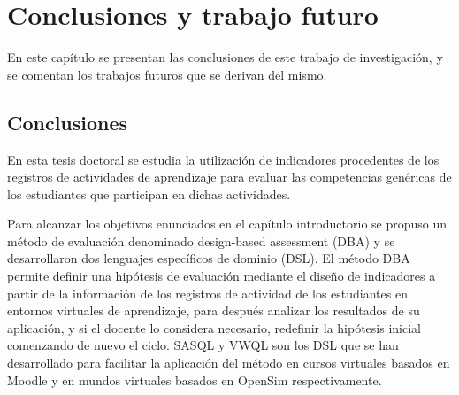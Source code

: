 



\chapter{Conclusiones y trabajo futuro}
\label{cha:Conclusions}

\ifpdf
    \graphicspath{{6_conclusion/figures/PNG/}{6_conclusion/figures/PDF/}{6_conclusion/figures/}}
\else
    \graphicspath{{6_conclusion/figures/EPS/}{6_conclusion/figures/}}
\fi


En este capítulo se presentan las conclusiones de este trabajo de investigación, y se comentan los trabajos futuros que se derivan del mismo.


\section{Conclusiones}

En esta tesis doctoral se estudia la utilización de indicadores procedentes de los registros de actividades de aprendizaje para evaluar las competencias genéricas de los estudiantes que participan en dichas actividades.

Para alcanzar los objetivos enunciados en el capítulo introductorio se propuso un método de evaluación denominado design-based assessment (DBA) y se desarrollaron dos lenguajes específicos de dominio (DSL). El método DBA permite definir una hipótesis de evaluación mediante el diseño de indicadores a partir de la información de los registros de actividad de los estudiantes en entornos virtuales de aprendizaje, para después analizar los resultados de su aplicación, y si el docente lo considera necesario, redefinir la hipótesis inicial comenzando de nuevo el ciclo. SASQL y VWQL son los DSL que se han desarrollado para facilitar la aplicación del método en cursos virtuales basados en Moodle y en mundos virtuales basados en OpenSim respectivamente.

